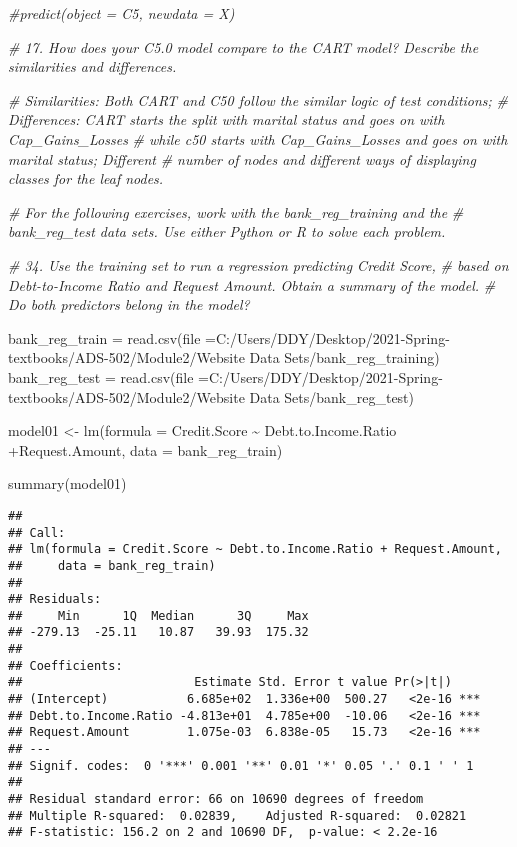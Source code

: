 \documentclass[
]{article}
\newenvironment{Shaded}{\begin{snugshade}}{\end{snugshade}}
\newcommand{\AttributeTok}[1]{\textcolor[rgb]{0.77,0.63,0.00}{#1}}
\newcommand{\CommentTok}[1]{\textcolor[rgb]{0.56,0.35,0.01}{\textit{#1}}}
\newcommand{\FunctionTok}[1]{\textcolor[rgb]{0.00,0.00,0.00}{#1}}
\newcommand{\NormalTok}[1]{#1}
\newcommand{\OtherTok}[1]{\textcolor[rgb]{0.56,0.35,0.01}{#1}}
\newcommand{\SpecialCharTok}[1]{\textcolor[rgb]{0.00,0.00,0.00}{#1}}
\newcommand{\StringTok}[1]{\textcolor[rgb]{0.31,0.60,0.02}{#1}}
\begin{document}
\begin{Shaded}
\begin{Highlighting}[]
\CommentTok{\#predict(object = C5, newdata = X)}

\CommentTok{\# 17. How does your C5.0 model compare to the CART model? Describe the similarities and differences.}

\CommentTok{\# Similarities: Both CART and C50 follow the similar logic of test conditions;}
\CommentTok{\# Differences: CART starts the split with marital status and goes on with Cap\_Gains\_Losses}
\CommentTok{\# while c50 starts with Cap\_Gains\_Losses and goes on with marital status; Different }
\CommentTok{\# number of nodes and different ways of displaying classes for the leaf nodes.}


\CommentTok{\# For the following exercises, work with the bank\_reg\_training and the }
\CommentTok{\# bank\_reg\_test data sets. Use either Python or R to solve each problem.}

\CommentTok{\# 34. Use the training set to run a regression predicting Credit Score, }
\CommentTok{\# based on Debt{-}to{-}Income Ratio and Request Amount. Obtain a summary of the model.}
\CommentTok{\# Do both predictors belong in the model?}

\NormalTok{bank\_reg\_train }\OtherTok{=} \FunctionTok{read.csv}\NormalTok{(}\AttributeTok{file =}\StringTok{\textquotesingle{}C:/Users/DDY/Desktop/2021{-}Spring{-}textbooks/ADS{-}502/Module2/Website Data Sets/bank\_reg\_training\textquotesingle{}}\NormalTok{)}
\NormalTok{bank\_reg\_test }\OtherTok{=} \FunctionTok{read.csv}\NormalTok{(}\AttributeTok{file =}\StringTok{\textquotesingle{}C:/Users/DDY/Desktop/2021{-}Spring{-}textbooks/ADS{-}502/Module2/Website Data Sets/bank\_reg\_test\textquotesingle{}}\NormalTok{)}


\NormalTok{model01 }\OtherTok{\textless{}{-}} \FunctionTok{lm}\NormalTok{(}\AttributeTok{formula =}\NormalTok{ Credit.Score }\SpecialCharTok{\textasciitilde{}}\NormalTok{ Debt.to.Income.Ratio }\SpecialCharTok{+}\NormalTok{Request.Amount,}
              \AttributeTok{data =}\NormalTok{ bank\_reg\_train)}

\FunctionTok{summary}\NormalTok{(model01)}
\end{Highlighting}
\end{Shaded}

\begin{verbatim}
## 
## Call:
## lm(formula = Credit.Score ~ Debt.to.Income.Ratio + Request.Amount, 
##     data = bank_reg_train)
## 
## Residuals:
##     Min      1Q  Median      3Q     Max 
## -279.13  -25.11   10.87   39.93  175.32 
## 
## Coefficients:
##                        Estimate Std. Error t value Pr(>|t|)    
## (Intercept)           6.685e+02  1.336e+00  500.27   <2e-16 ***
## Debt.to.Income.Ratio -4.813e+01  4.785e+00  -10.06   <2e-16 ***
## Request.Amount        1.075e-03  6.838e-05   15.73   <2e-16 ***
## ---
## Signif. codes:  0 '***' 0.001 '**' 0.01 '*' 0.05 '.' 0.1 ' ' 1
## 
## Residual standard error: 66 on 10690 degrees of freedom
## Multiple R-squared:  0.02839,    Adjusted R-squared:  0.02821 
## F-statistic: 156.2 on 2 and 10690 DF,  p-value: < 2.2e-16
\end{verbatim}
\end{document}
